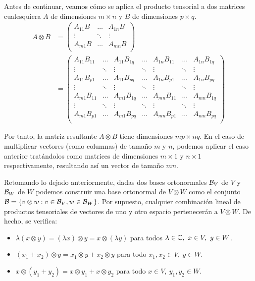 Antes de continuar, veamos cómo se aplica el producto tensorial a dos matrices cualesquiera $A$ de dimensiones $m\times n$ y $B$ de dimensiones $p\times q$.
\begin{equation}
\begin{aligned}
A\otimes B&=
\left(\begin{matrix}
A_{11}B & \hdots & A_{1n}B \\
\vdots & \ddots & \vdots \\
A_{m1}B & \hdots & A_{mn}B \\
\end{matrix}\right)\\
&=
\left(\begin{matrix}
A_{11}B_{11} & \hdots & A_{11}B_{1q} & \hdots & A_{1n}B_{11} & \hdots & A_{1n}B_{1q} \\
\vdots & \ddots & \vdots & \ddots & \vdots & \ddots & \vdots \\
A_{11}B_{p1} & \hdots & A_{11}B_{pq} & \hdots & A_{1n}B_{p1} & \hdots & A_{1n}B_{pq} \\
\vdots & \ddots & \vdots & \ddots & \vdots & \ddots & \vdots \\
A_{m1}B_{11} & \hdots & A_{m1}B_{1q} & \hdots & A_{mn}B_{11} & \hdots & A_{mn}B_{1q} \\
\vdots & \ddots & \vdots & \ddots & \vdots & \ddots & \vdots \\
A_{m1}B_{p1} & \hdots & A_{m1}B_{pq} & \hdots & A_{mn}B_{p1} & \hdots & A_{mn}B_{pq} \\
\end{matrix}\right)
\end{aligned}
\end{equation}

Por tanto, la matriz resultante $A\otimes B$ tiene dimensiones $mp\times nq$. En el caso de multiplicar vectores (como columnas) de tamaño $m$ y $n$, podemos aplicar el caso anterior tratándolos como matrices de dimensiones $m\times 1$ y $n\times 1$ respectivamente, resultando así un vector de tamaño $mn$.

Retomando lo dejado anteriormente, dadas dos bases ortonormales $\mathcal{B}_V$ de $V$ y $\mathcal{B}_W$ de $W$ podemos construir una base ortonormal de $V\otimes W$ como el conjunto $\mathcal{B}=\{v\otimes w:v\in\mathcal{B}_V,w\in\mathcal{B}_W\}$. Por supuesto, cualquier combinación lineal de productos tensoriales de vectores de uno y otro espacio pertenecerán a $V\otimes W$. De hecho, se verifica:

\begin{itemize}
\item $\lambda (x\otimes y) = (\lambda x)\otimes y = x\otimes(\lambda y)$ para todos $\lambda\in\mathbb{C},\ x\in V,\ y\in W$.
\item $(x_1+x_2)\otimes y = x_1\otimes y+x_2\otimes y$ para todo $x_1,x_2\in V,\ y\in W$.
\item $x \otimes(y_1 + y_2)= x\otimes y_1 + x\otimes y_2$ para todo $x\in V,\ y_1,y_2\in W$.
\end{itemize}

